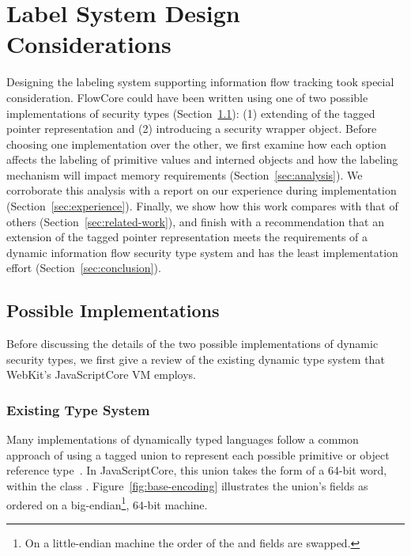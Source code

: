 
\chapter{Label System Design Considerations}

Designing the labeling system supporting information flow tracking took special consideration.
FlowCore could have been written using one of two possible implementations of security types (Section~\ref{sec:implementation}): (1) extending of the tagged pointer representation and (2) introducing a security wrapper object.
Before choosing one implementation over the other, we first examine how each option affects the labeling of primitive values and interned objects and how the labeling mechanism will impact memory requirements (Section~\ref{sec:analysis}).
We corroborate this analysis with a report on our experience during implementation (Section~\ref{sec:experience}).
Finally, we show how this work compares with that of others (Section~\ref{sec:related-work}), and finish with a recommendation that an extension of the tagged pointer representation meets the requirements of a dynamic information flow security type system and has the least implementation effort (Section~\ref{sec:conclusion}).

\section{Possible Implementations}
\label{sec:implementation}

Before discussing the details of the two possible implementations of dynamic security types, we first give a review of the existing dynamic type system that WebKit's JavaScriptCore VM employs.

\subsection{Existing Type System}

Many implementations of dynamically typed languages follow a common approach of using a tagged union to represent each possible primitive or object reference type~\cite{gudeman1993representing}.
In JavaScriptCore, this union takes the form of a 64-bit word, within the class .
Figure~\ref{fig:base-encoding} illustrates the union's fields as ordered on a big-endian\footnote{On a little-endian machine the order of the  and  fields are swapped.}, 64-bit machine.

